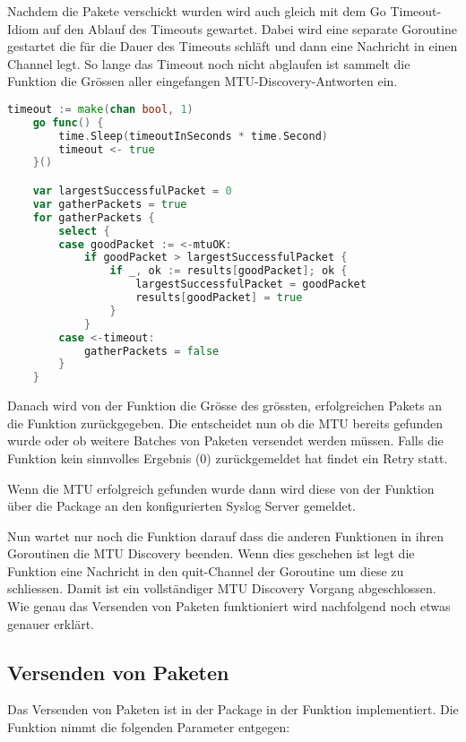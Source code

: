 Nachdem die Pakete verschickt wurden wird auch gleich mit dem Go Timeout-Idiom auf den Ablauf des Timeouts gewartet. Dabei wird eine separate Goroutine gestartet die für die Dauer des Timeouts schläft und dann eine Nachricht in einen Channel legt. So lange das Timeout noch nicht abglaufen ist sammelt die  Funktion die Grössen aller eingefangen MTU-Discovery-Antworten ein.

\begin{lstlisting}[language=go, caption=Antworten einsammeln in mtu.sendBatch(..)]    
	timeout := make(chan bool, 1)
	go func() {
		time.Sleep(timeoutInSeconds * time.Second)
		timeout <- true
	}()

	var largestSuccessfulPacket = 0
	var gatherPackets = true
	for gatherPackets {
		select {
		case goodPacket := <-mtuOK:
			if goodPacket > largestSuccessfulPacket {
				if _, ok := results[goodPacket]; ok {
					largestSuccessfulPacket = goodPacket
					results[goodPacket] = true
				}
			}
		case <-timeout:
			gatherPackets = false
		}
	}
\end{lstlisting}

Danach wird von der  Funktion die Grösse des grössten, erfolgreichen Pakets an die  Funktion zurückgegeben. Die  entscheidet nun ob die \ac{MTU} bereits gefunden wurde oder ob weitere Batches von Paketen versendet werden müssen.
Falls die  Funktion kein sinnvolles Ergebnis (0) zurückgemeldet hat findet ein Retry statt.

Wenn die \ac{MTU} erfolgreich gefunden wurde dann wird diese von der  Funktion über die  Package an den konfigurierten Syslog Server gemeldet.

Nun wartet nur noch die  Funktion darauf dass die anderen  Funktionen in ihren Goroutinen die \ac{MTU} Discovery beenden. Wenn dies geschehen ist legt die  Funktion eine Nachricht in den quit-Channel der  Goroutine um diese zu schliessen. Damit ist ein vollständiger \ac{MTU} Discovery Vorgang abgeschlossen. Wie genau das Versenden von Paketen funktioniert wird nachfolgend noch etwas genauer erklärt.

\subsection{Versenden von Paketen}
Das Versenden von Paketen ist in der  Package in der  Funktion implementiert. Die  Funktion nimmt die folgenden Parameter entgegen:

